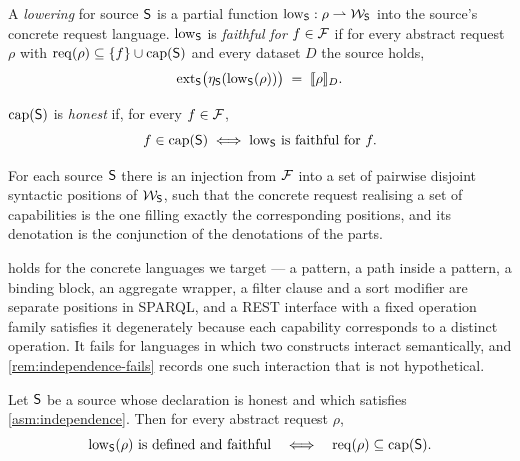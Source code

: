 \begin{definition}[Lowering]
\label{def:lowering}
A \emph{lowering} for source $\mathsf{S}$ is a partial function
$\mathrm{low}_{\mathsf{S}} : \rho \rightharpoonup \mathcal{W}_{\mathsf{S}}$ into the source's concrete
request language. $\mathrm{low}_{\mathsf{S}}$ is \emph{faithful for} $f \in \mathcal{F}$ if for every
abstract request $\rho$ with $\mathrm{req}(\rho) \subseteq \{f\} \cup \mathrm{cap}(\mathsf{S})$ and
every dataset $D$ the source holds,
\[
\mathrm{ext}_{\mathsf{S}}\bigl(\eta_{\mathsf{S}}(\mathrm{low}_{\mathsf{S}}(\rho))\bigr) \;=\; \llbracket \rho \rrbracket_D .
\]
\end{definition}

\begin{definition}
\label{def:honest}
$\mathrm{cap}(\mathsf{S})$ is \emph{honest} if, for every $f \in \mathcal{F}$,
\[
f \in \mathrm{cap}(\mathsf{S}) \iff \mathrm{low}_{\mathsf{S}} \text{ is faithful for } f .
\]
\end{definition}

\begin{assumption}
\label{asm:independence}
For each source $\mathsf{S}$ there is an injection from $\mathcal{F}$ into a set of
pairwise disjoint syntactic positions of $\mathcal{W}_{\mathsf{S}}$, such that the
concrete request realising a set of capabilities is the one filling exactly the
corresponding positions, and its denotation is the conjunction of the
denotations of the parts.
\end{assumption}

 holds for the concrete languages we target --- a
pattern, a path inside a pattern, a binding block, an aggregate wrapper, a
filter clause and a sort modifier are separate positions in SPARQL, and a REST
interface with a fixed operation family satisfies it degenerately because each
capability corresponds to a distinct operation. It fails for languages in which
two constructs interact semantically, and \cref{rem:independence-fails} records
one such interaction that is not hypothetical.

\begin{theorem}
\label{thm:lowering}
Let $\mathsf{S}$ be a source whose declaration is honest and which satisfies
\cref{asm:independence}. Then for every abstract request $\rho$,
\[
\mathrm{low}_{\mathsf{S}}(\rho) \text{ is defined and faithful}
\quad\Longleftrightarrow\quad
\mathrm{req}(\rho) \subseteq \mathrm{cap}(\mathsf{S}).
\]
\end{theorem}

